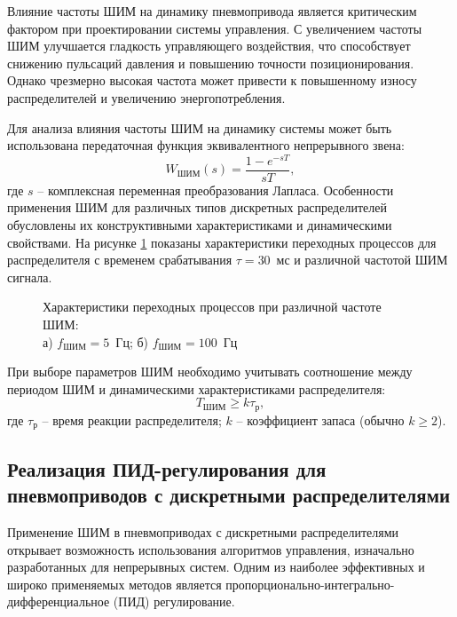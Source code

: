 Влияние частоты ШИМ на динамику пневмопривода является критическим фактором при
проектировании системы управления. С увеличением частоты ШИМ улучшается
гладкость управляющего воздействия, что способствует снижению пульсаций давления
и повышению точности позиционирования. Однако чрезмерно высокая частота может привести
к повышенному износу распределителей и увеличению энергопотребления.

Для анализа влияния частоты ШИМ на динамику системы может быть использована передаточная функция эквивалентного непрерывного звена:
\begin{equation*}
	W_{\text{ШИМ}}(s) = \frac{1 - e^{-sT}}{sT},
\end{equation*}
где $s$ -- комплексная переменная преобразования Лапласа.
Особенности применения ШИМ для различных типов дискретных
распределителей обусловлены их конструктивными характеристиками и
динамическими свойствами. На рисунке \ref{fig:ch3:pwm_valve_response} показаны
характеристики переходных процессов для распределителя с временем срабатывания $\tau = 30$~мс и различной
частотой ШИМ сигнала.

\begin{figure}[ht]
	\caption{Характеристики переходных процессов при различной частоте ШИМ:\\
		а) $f_{\text{ШИМ}} = \num{5}$~Гц; б) $f_{\text{ШИМ}} = \num{100}$~Гц
	}
	\label{fig:ch3:pwm_valve_response}
\end{figure}

При выборе параметров ШИМ необходимо учитывать соотношение между
периодом ШИМ и динамическими характеристиками распределителя:
\begin{equation*}
	T_{ШИМ} \geq k\tau_{\text{р}},
\end{equation*}
где $\tau_{\text{р}}$ -- время реакции распределителя;
$k$ -- коэффициент запаса (обычно $k \geq 2$).

\subsection{Реализация ПИД-регулирования для пневмоприводов с дискретными распределителями}\label{subsec:ch3/sec2/sub2}
Применение ШИМ в пневмоприводах с дискретными распределителями открывает
возможность использования алгоритмов управления,
изначально разработанных для непрерывных систем.
Одним из наиболее эффективных и широко применяемых методов является
пропорционально-интегрально-дифференциальное (ПИД) регулирование.

